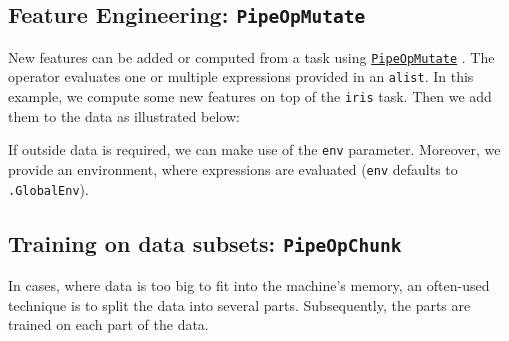 \documentclass[
]{scrbook}
\newenvironment{Shaded}{\begin{snugshade}}{\end{snugshade}}
\newcommand{\AttributeTok}[1]{\textcolor[rgb]{0.77,0.63,0.00}{#1}}
\newcommand{\CommentTok}[1]{\textcolor[rgb]{0.56,0.35,0.01}{\textit{#1}}}
\newcommand{\FunctionTok}[1]{\textcolor[rgb]{0.00,0.00,0.00}{#1}}
\newcommand{\NormalTok}[1]{#1}
\newcommand{\OtherTok}[1]{\textcolor[rgb]{0.56,0.35,0.01}{#1}}
\newcommand{\SpecialCharTok}[1]{\textcolor[rgb]{0.00,0.00,0.00}{#1}}
\newcommand{\StringTok}[1]{\textcolor[rgb]{0.31,0.60,0.02}{#1}}
\renewenvironment{Shaded} {\begin{snugshade}\small} {\end{snugshade}}
\begin{document}
\hypertarget{feature-engineering-pipeopmutate}{%
\subsection{\texorpdfstring{Feature Engineering: \texttt{PipeOpMutate}}{Feature Engineering: PipeOpMutate}}\label{feature-engineering-pipeopmutate}}

New features can be added or computed from a task using \href{https://mlr3pipelines.mlr-org.com/reference/mlr_pipeops_mutate.html}{\texttt{PipeOpMutate}} .
The operator evaluates one or multiple expressions provided in an \texttt{alist}.
In this example, we compute some new features on top of the \texttt{iris} task.
Then we add them to the data as illustrated below:

\begin{Shaded}
\end{Shaded}

If outside data is required, we can make use of the \texttt{env} parameter.
Moreover, we provide an environment, where expressions are evaluated (\texttt{env} defaults to \texttt{.GlobalEnv}).

\hypertarget{training-on-data-subsets-pipeopchunk}{%
\subsection{\texorpdfstring{Training on data subsets: \texttt{PipeOpChunk}}{Training on data subsets: PipeOpChunk}}\label{training-on-data-subsets-pipeopchunk}}

In cases, where data is too big to fit into the machine's memory, an often-used technique is to split the data into several parts.
Subsequently, the parts are trained on each part of the data.
\end{document}
